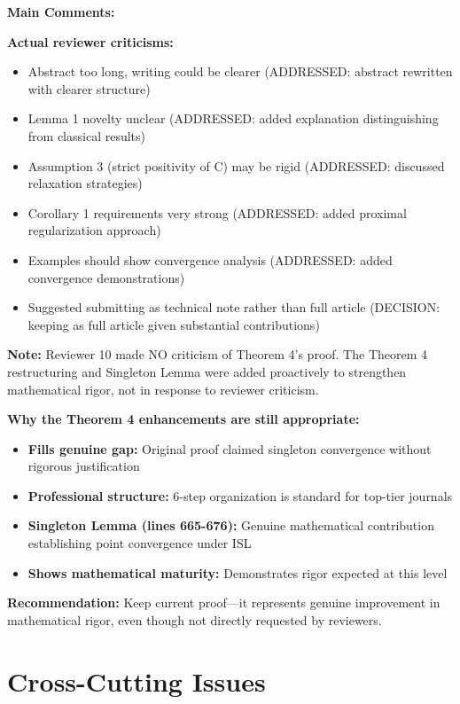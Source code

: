 \documentclass[11pt]{article}
\begin{document}
\textbf{Main Comments:}

\textbf{Actual reviewer criticisms:}
\begin{itemize}[leftmargin=*]
\item Abstract too long, writing could be clearer (ADDRESSED: abstract rewritten with clearer structure)
\item Lemma 1 novelty unclear (ADDRESSED: added explanation distinguishing from classical results)
\item Assumption 3 (strict positivity of C) may be rigid (ADDRESSED: discussed relaxation strategies)
\item Corollary 1 requirements very strong (ADDRESSED: added proximal regularization approach)
\item Examples should show convergence analysis (ADDRESSED: added convergence demonstrations)
\item Suggested submitting as technical note rather than full article (DECISION: keeping as full article given substantial contributions)
\end{itemize}

\textbf{Note:} \textcolor{critical}{Reviewer 10 made NO criticism of Theorem 4's proof.} The Theorem 4 restructuring and Singleton Lemma were added proactively to strengthen mathematical rigor, not in response to reviewer criticism.

\textbf{Why the Theorem 4 enhancements are still appropriate:}
\begin{itemize}[leftmargin=*]
\item \textbf{Fills genuine gap:} Original proof claimed singleton convergence without rigorous justification
\item \textbf{Professional structure:} 6-step organization is standard for top-tier journals
\item \textbf{Singleton Lemma (lines 665-676):} Genuine mathematical contribution establishing point convergence under ISL
\item \textbf{Shows mathematical maturity:} Demonstrates rigor expected at this level
\end{itemize}

\textbf{Recommendation:} Keep current proof—it represents genuine improvement in mathematical rigor, even though not directly requested by reviewers.

\section{Cross-Cutting Issues}
\end{document}
